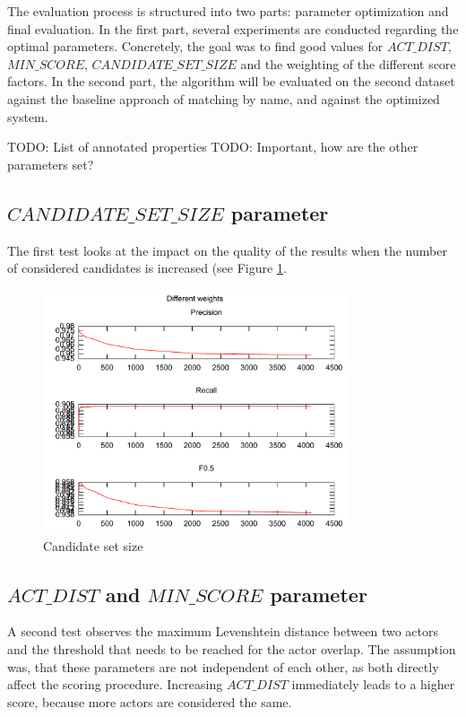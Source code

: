 The evaluation process is structured into two parts: parameter optimization and final evaluation.
In the first part, several experiments are conducted regarding the optimal parameters.
Concretely, the goal was to find good values for $ACT\_DIST$, $MIN\_SCORE$, $CANDIDATE\_SET\_SIZE$ and the weighting of the different score factors.
In the second part, the algorithm will be evaluated on the second dataset against the baseline approach of matching by name, and against the optimized system.

TODO: List of annotated properties
TODO: Important, how are the other parameters set?

\subsection{$CANDIDATE\_SET\_SIZE$ parameter}
The first test looks at the impact on the quality of the results when the number of considered candidates is increased (see Figure \ref{fig_candidate_set_size}.

\begin{figure}[h!]
  \begin{center}
  \includegraphics[width=0.8\textwidth]{images/candidateSetSize.pdf}
  \end{center}
  \caption{Candidate set size}
  \label{fig_candidate_set_size}
\end{figure}

\subsection{$ACT\_DIST$ and $MIN\_SCORE$ parameter}
A second test observes the maximum Levenshtein distance between two actors and the threshold that needs to be reached for the actor overlap.
The assumption was, that these parameters are not independent of each other, as both directly affect the scoring procedure.
Increasing $ACT\_DIST$ immediately leads to a higher score, because more actors are considered the same.



